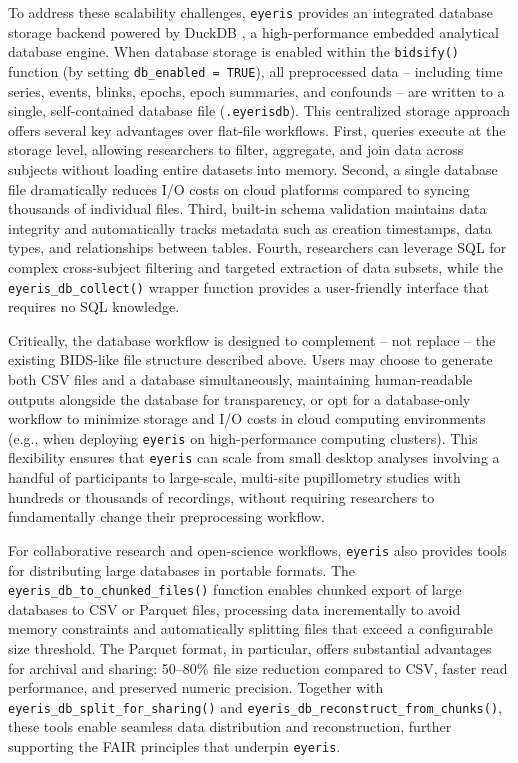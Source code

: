 To address these scalability challenges, \texttt{eyeris} provides an integrated database storage backend powered by DuckDB \parencite{raasveldt2019duckdb}, a high-performance embedded analytical database engine. When database storage is enabled within the \texttt{bidsify()} function (by setting \texttt{db\_enabled = TRUE}), all preprocessed data – including time series, events, blinks, epochs, epoch summaries, and confounds – are written to a single, self-contained database file (\texttt{.eyerisdb}). This centralized storage approach offers several key advantages over flat-file workflows. First, queries execute at the storage level, allowing researchers to filter, aggregate, and join data across subjects without loading entire datasets into memory. Second, a single database file dramatically reduces I/O costs on cloud platforms compared to syncing thousands of individual files. Third, built-in schema validation maintains data integrity and automatically tracks metadata such as creation timestamps, data types, and relationships between tables. Fourth, researchers can leverage SQL for complex cross-subject filtering and targeted extraction of data subsets, while the \texttt{eyeris\_db\_collect()} wrapper function provides a user-friendly interface that requires no SQL knowledge.

Critically, the database workflow is designed to complement – not replace – the existing BIDS-like file structure described above. Users may choose to generate both CSV files and a database simultaneously, maintaining human-readable outputs alongside the database for transparency, or opt for a database-only workflow to minimize storage and I/O costs in cloud computing environments (e.g., when deploying \texttt{eyeris} on high-performance computing clusters). This flexibility ensures that \texttt{eyeris} can scale from small desktop analyses involving a handful of participants to large-scale, multi-site pupillometry studies with hundreds or thousands of recordings, without requiring researchers to fundamentally change their preprocessing workflow.

For collaborative research and open-science workflows, \texttt{eyeris} also provides tools for distributing large databases in portable formats. The \texttt{eyeris\_db\_to\_chunked\_files()} function enables chunked export of large databases to CSV or Parquet files, processing data incrementally to avoid memory constraints and automatically splitting files that exceed a configurable size threshold. The Parquet format, in particular, offers substantial advantages for archival and sharing: 50–80\% file size reduction compared to CSV, faster read performance, and preserved numeric precision. Together with \texttt{eyeris\_db\_split\_for\_sharing()} and \texttt{eyeris\_db\_reconstruct\_from\_chunks()}, these tools enable seamless data distribution and reconstruction, further supporting the FAIR principles that underpin \texttt{eyeris}.

